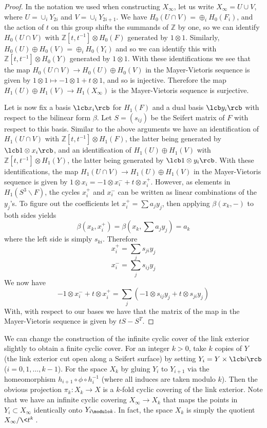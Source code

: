 \begin{proof}
In the notation we used when constructing $X_\infty$, let us write $X_\infty = U \cup V$, where $U = \cup_i Y_{2i}$ and $V = \cup_i Y_{2i+1}$. We have $H_0(U \cap V) = \oplus_i H_0(F_i)$, and the action of $t$ on this group shifts the summands of $\mathbb Z$ by one, so we can identify $H_0(U \cap V)$ with $\mathbb Z[t,t^{-1}] \otimes H_0(F)$ generated by $1 \otimes 1$. Similarly, $H_0(U) \oplus H_0(V) = \oplus_i H_0(Y_i)$ and so we can identify this with $\mathbb Z[t,t^{-1}] \otimes H_0(Y)$ generated by $1 \otimes 1$. With these identifications we see that the map $H_0(U \cap V) \rightarrow H_0(U) \oplus H_0(V)$ in the Mayer-Vietoris sequence is given by $1 \otimes 1 \mapsto -1\otimes 1 + t \otimes 1$, and so is injective. Therefore the map $H_1(U) \oplus H_1(V) \rightarrow H_1(X_\infty)$ is the Mayer-Vietoris sequence is surjective.

Let is now fix a basis $\lcb x_i \rcb$ for $H_1(F)$ and a dual basis $\lcb y_i \rcb$ with respect to the bilinear form $\beta$. Let $S = (s_{ij})$ be the Seifert matrix of $F$ with respect to this basis. Similar to the above arguments we have an identification of $H_1(U \cap V)$ with $\mathbb Z[t,t^{-1}] \otimes H_1(F)$, the latter being generated by $\lcb 1 \otimes x_i \rcb$, and an identification of $H_1(U) \oplus H_1(V)$ with $\mathbb Z[t,t^{-1}] \otimes H_1(Y)$, the latter being generated by $\lcb 1 \otimes y_i \rcb$. With these identifications, the map $H_1(U \cap V) \rightarrow H_1(U) \oplus H_1(V)$ in the Mayer-Vietoris sequence is given by $1 \otimes x_i = -1 \otimes x_i^- + t \otimes x_i^+$. However, as elements in $H_1(S^3 \backslash F)$, the cycles $x_i^+$ and $x_i^-$ can be written as linear combinations of the $y_j$'s. To figure out the coefficients let $x_i^+ = \sum a_j y_j$, then applying $\beta(x_k,-)$ to both sides yields
\[ \beta(x_k,x_i^+) = \beta(x_k,\sum a_j y_j) = a_k \]
where the left side is simply $s_{ki}$. Therefore
\[ x_i^+ = \sum_j s_{ji} y_j \]
\[ x_i^- = \sum_j s_{ij} y_j \]
We now have
\[ -1 \otimes x_i^- + t \otimes x_i^+ = \sum_j (-1 \otimes s_{ij} y_j + t \otimes s_{ji} y_j) \]
With, with respect to our bases we have that the matrix of the map in the Mayer-Vietoris sequence is given by $tS-S^T$.
\end{proof}






We can change the construction of the infinite cyclic cover of the link exterior slightly to obtain a finite cyclic cover. For an integer $k > 0$, take $k$ copies of $Y$ (the link exterior cut open along a Seifert surface) by setting $Y_i = Y \times \lcb i \rcb$ ($i=0,1,\ldots,k-1$). For the space $X_k$ by gluing $Y_i$ to $Y_{i+1}$ via the homeomorphism $h_{i+1} \circ \phi \circ h_i^{-1}$ (where all induces are taken modulo $k$). Then the obvious projection $\pi_k : X_k \rightarrow X$ is a $k$-fold cyclic covering of the link exterior. Note that we have an infinite cyclic covering $X_\infty \rightarrow X_k$ that maps the points in $Y_i \subset X_\infty$ identically onto $Y_{i \modulo k}$. In fact, the space $X_k$ is simply the quotient $X_\infty / \< t^k \>$.

